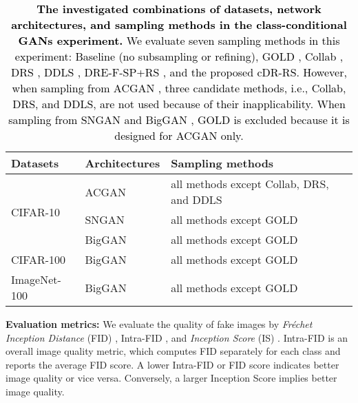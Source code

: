\documentclass[final,12pt, 3p,times]{elsarticle}
\def\rev#1{\textcolor{black}{#1}}
\begin{document}
\begin{table}[htbp]
  \centering
  \caption{\rev{\textbf{The investigated combinations of datasets, network architectures, and sampling methods in the class-conditional GANs experiment.} We evaluate seven sampling methods in this experiment: Baseline (no subsampling or refining), GOLD \cite{mo2019mining}, Collab \cite{liu2020collaborative}, DRS \cite{azadi2018discriminator}, DDLS \cite{che2020your}, DRE-F-SP+RS \cite{ding2020subsampling}, and the proposed cDR-RS. However, when sampling from ACGAN \cite{odena2017conditional}, three candidate methods, i.e., Collab, DRS, and DDLS, are not used because of their inapplicability. When sampling from SNGAN \cite{miyato2018spectral} and BigGAN \cite{brock2018large}, GOLD is excluded because it is designed for ACGAN only.}}
    \begin{adjustbox}{width=0.75\textwidth}
    \begin{tabular}{lll}
    \hline\hline
    \textbf{Datasets} & \textbf{Architectures} & \textbf{Sampling methods} \\
    \hline
    \multicolumn{1}{l}{\multirow{3}[0]{*}{CIFAR-10}} & ACGAN & all methods except Collab, DRS, and DDLS \\
    \multicolumn{1}{l}{} & SNGAN & all methods except GOLD \\
    \multicolumn{1}{l}{} & BigGAN & all methods except GOLD \\
    \hline
    CIFAR-100 & BigGAN & all methods except GOLD \\
    \hline
    ImageNet-100 & BigGAN & all methods except GOLD \\
    \bottomrule
    \end{tabular}\end{adjustbox}
  \label{tab:dataset_arch_samp_classification}\end{table}


{\setlength{\parindent}{0cm} \textbf{Evaluation metrics:}} We evaluate the quality of fake images by \textit{Fr\'echet Inception Distance} (FID) \cite{heusel2017gans}, Intra-FID \cite{miyato2018cgans}, and \textit{Inception Score} (IS) \cite{salimans2016improved}. Intra-FID is an overall image quality metric, which computes FID separately for each class and reports the average FID score. A lower Intra-FID or FID score indicates better image quality or vice versa. Conversely, a larger Inception Score implies better image quality. 
\end{document}
